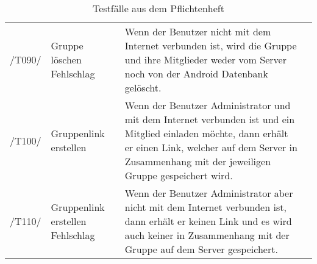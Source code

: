 \begin{table}[H]
{\begin{tabular}{|p{}||p{}|p{}|>{\centering}p{}|}
				\hspace{0pt}/T090/& Gruppe löschen Fehlschlag & Wenn der Benutzer nicht mit dem Internet verbunden ist, wird die Gruppe und ihre Mitglieder weder vom Server noch von der Android Datenbank gelöscht. & \checkmark\tabularnewline
				\hspace{0pt}/T100/& Gruppenlink erstellen & Wenn der Benutzer Administrator und mit dem Internet verbunden ist und ein Mitglied einladen möchte, dann erhält er einen Link, welcher auf dem Server in Zusammenhang mit der jeweiligen Gruppe gespeichert wird. & \checkmark\tabularnewline
				\hspace{0pt}/T110/& Gruppenlink erstellen Fehlschlag & Wenn der Benutzer Administrator aber nicht mit dem Internet verbunden ist, dann erhält er keinen Link und es wird auch keiner in Zusammenhang mit der Gruppe auf dem Server gespeichert. & \checkmark\tabularnewline
				\hline
			\end{tabular}}
			\caption{Testfälle aus dem Pflichtenheft}
		\end{table}
